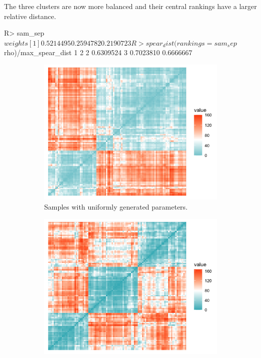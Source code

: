 The three clusters are now more balanced and their central rankings have a larger relative distance.
\begin{example}
R> sam_sep$weights
[1] 0.5214495 0.2594782 0.2190723

R> spear_dist(rankings = sam_sep$rho)/max_spear_dist
     1         2
2 0.6309524
3 0.7023810 0.6666667
\end{example}
\begin{figure}[t]
     \centering
     \begin{subfigure}[b]{0.49\textwidth}
         \centering
         \includegraphics[width=\textwidth]{figures/RJ2025_paper_dist1_new.png}
         \caption{{Samples with uniformly generated parameters.}}
         \label{fig:s1a}
     \end{subfigure}
     \hfill
     \begin{subfigure}[b]{0.49\textwidth}
         \centering
         \includegraphics[width=\textwidth]{figures/RJ2025_paper_dist2_new.png}

\end{subfigure}
\end{figure}
